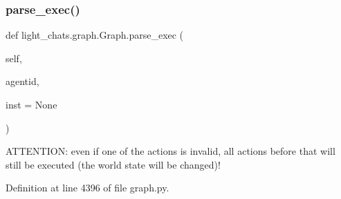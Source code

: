 \subsubsection{\texorpdfstring{parse\+\_\+exec()}{parse\_exec()}}
{\footnotesize\ttfamily def light\+\_\+chats.\+graph.\+Graph.\+parse\+\_\+exec (\begin{DoxyParamCaption}\item[{}]{self,  }\item[{}]{agentid,  }\item[{}]{inst = {\ttfamily None} }\end{DoxyParamCaption})}

\begin{DoxyVerb}ATTENTION: even if one of the actions is invalid, all actions
before that will still be executed (the world state will be changed)!
\end{DoxyVerb}
 

Definition at line 4396 of file graph.\+py.


